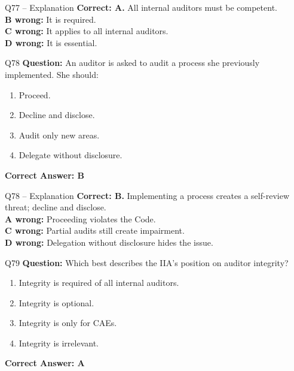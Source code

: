 \documentclass[aspectratio=169,10pt]{beamer}
\begin{document}
	\begin{frame}[t]{Q77 -- Explanation}
		\small
		\textbf{Correct: A.} All internal auditors must be competent. \\[4pt]
		\textbf{B wrong:} It is required. \\[2pt]
		\textbf{C wrong:} It applies to all internal auditors. \\[2pt]
		\textbf{D wrong:} It is essential.
	\end{frame}
	
	\begin{frame}[t]{Q78}
		\small
		\textbf{Question:} An auditor is asked to audit a process she previously implemented. She should:
		\begin{enumerate}[label=\Alph*.,itemsep=1pt,topsep=2pt]
			\item Proceed.
			\item Decline and disclose.
			\item Audit only new areas.
			\item Delegate without disclosure.
		\end{enumerate}
		\vspace{4pt}
		\textbf{Correct Answer: B}
	\end{frame}
	
	\begin{frame}[t]{Q78 -- Explanation}
		\small
		\textbf{Correct: B.} Implementing a process creates a self-review threat; decline and disclose. \\[4pt]
		\textbf{A wrong:} Proceeding violates the Code. \\[2pt]
		\textbf{C wrong:} Partial audits still create impairment. \\[2pt]
		\textbf{D wrong:} Delegation without disclosure hides the issue.
	\end{frame}
	
	\begin{frame}[t]{Q79}
		\small
		\textbf{Question:} Which best describes the IIA's position on auditor integrity?
		\begin{enumerate}[label=\Alph*.,itemsep=1pt,topsep=2pt]
			\item Integrity is required of all internal auditors.
			\item Integrity is optional.
			\item Integrity is only for CAEs.
			\item Integrity is irrelevant.
		\end{enumerate}
		\vspace{4pt}
		\textbf{Correct Answer: A}
	\end{frame}
	
\end{document}
